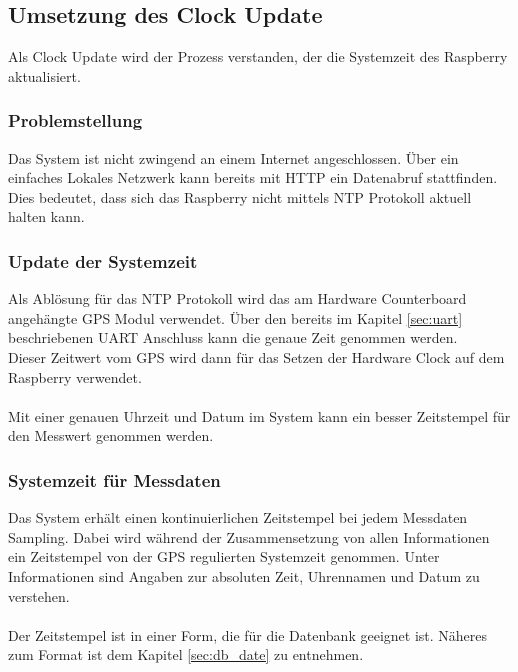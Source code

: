 \subsection{Umsetzung des Clock Update}
Als Clock Update wird der Prozess verstanden, der die Systemzeit des Raspberry aktualisiert.

\subsubsection{Problemstellung}
Das System ist nicht zwingend an einem Internet angeschlossen. Über ein einfaches Lokales Netzwerk kann bereits mit HTTP ein Datenabruf stattfinden. Dies bedeutet, dass sich das Raspberry nicht mittels NTP Protokoll aktuell halten kann.

\subsubsection{Update der Systemzeit}
Als Ablösung für das NTP Protokoll wird das am Hardware Counterboard angehängte GPS Modul verwendet. Über den bereits im Kapitel \ref{sec:uart} beschriebenen UART Anschluss kann die genaue Zeit genommen werden.\\
Dieser Zeitwert vom GPS wird dann für das Setzen der Hardware Clock auf dem Raspberry verwendet.\\
\\
Mit einer genauen Uhrzeit und Datum im System kann ein besser Zeitstempel für den Messwert genommen werden. 

\subsubsection{Systemzeit für Messdaten}
Das System erhält einen kontinuierlichen Zeitstempel bei jedem Messdaten Sampling. Dabei wird während der Zusammensetzung von allen Informationen ein Zeitstempel von der GPS regulierten Systemzeit genommen. Unter Informationen sind Angaben zur absoluten Zeit, Uhrennamen und Datum zu verstehen.\\
\\
Der Zeitstempel ist in einer Form, die für die Datenbank geeignet ist. Näheres zum Format ist dem Kapitel \ref{sec:db_date} zu entnehmen.